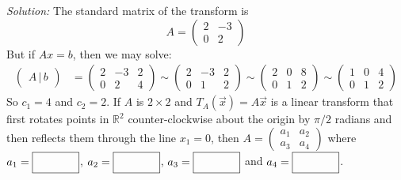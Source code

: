     \ifnum {} {\color{DarkBlue} \textit{Solution:} The standard matrix of the transform is $$A = \begin{pmatrix}2&-3\\0&2 \end{pmatrix}$$ But if $Ax=b$, then we may solve: 
    \begin{align}
        \begin{pmatrix} A \, | \, b \end{pmatrix} &= \begin{pmatrix} 2&-3&2\\0&2&4\end{pmatrix}
        \sim \begin{pmatrix} 2&-3&2\\0&1&2\end{pmatrix} 
        \sim \begin{pmatrix} 2&0&8\\0&1&2\end{pmatrix} 
        \sim \begin{pmatrix} 1&0&4\\0&1&2\end{pmatrix} 
    \end{align} So $c_1 = 4$ and $c_2 = 2$.} \fi    
\fi 
\ifnum {}
      If $A$ is $2 \times 2$ and $T_A(\vec x)=A\vec x$ is a linear transform that first rotates points in $\mathbb R^2$ counter-clockwise about the origin by $\pi/2$ radians and then reflects them through the line $x_1 = 0$, then $A=\begin{pmatrix} a_1 & a_2 \\ a_3 & a_4 \end{pmatrix} $ where $a_1 = \framebox{\strut\hspace{1.25cm}}$, $a_2 = \framebox{\strut\hspace{1.25cm}}$, $a_3 = \framebox{\strut\hspace{1.25cm}}$ and $a_4 = \framebox{\strut\hspace{1.25cm}}$.

